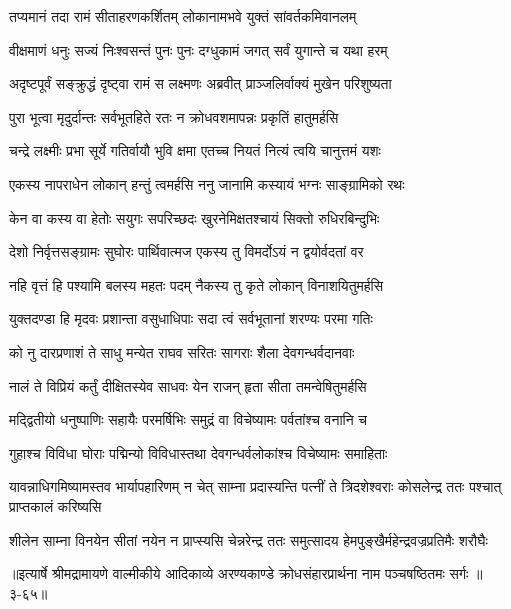 
\twolineshloka
{तप्यमानं तदा रामं सीताहरणकर्शितम्}
{लोकानामभवे युक्तं सांवर्तकमिवानलम्} %

\twolineshloka
{वीक्षमाणं धनुः सज्यं निःश्वसन्तं पुनः पुनः}
{दग्धुकामं जगत् सर्वं युगान्ते च यथा हरम्} %

\twolineshloka
{अदृष्टपूर्वं सङ्क्रुद्धं दृष्ट्वा रामं स लक्ष्मणः}
{अब्रवीत् प्राञ्जलिर्वाक्यं मुखेन परिशुष्यता} %

\twolineshloka
{पुरा भूत्वा मृदुर्दान्तः सर्वभूतहिते रतः}
{न क्रोधवशमापन्नः प्रकृतिं हातुमर्हसि} %

\twolineshloka
{चन्द्रे लक्ष्मीः प्रभा सूर्ये गतिर्वायौ भुवि क्षमा}
{एतच्च नियतं नित्यं त्वयि चानुत्तमं यशः} %

\twolineshloka
{एकस्य नापराधेन लोकान् हन्तुं त्वमर्हसि}
{ननु जानामि कस्यायं भग्नः साङ्ग्रामिको रथः} %

\twolineshloka
{केन वा कस्य वा हेतोः सयुगः सपरिच्छदः}
{खुरनेमिक्षतश्चायं सिक्तो रुधिरबिन्दुभिः} %

\twolineshloka
{देशो निर्वृत्तसङ्ग्रामः सुघोरः पार्थिवात्मज}
{एकस्य तु विमर्दोऽयं न द्वयोर्वदतां वर} %

\twolineshloka
{नहि वृत्तं हि पश्यामि बलस्य महतः पदम्}
{नैकस्य तु कृते लोकान् विनाशयितुमर्हसि} %

\twolineshloka
{युक्तदण्डा हि मृदवः प्रशान्ता वसुधाधिपाः}
{सदा त्वं सर्वभूतानां शरण्यः परमा गतिः} %

\twolineshloka
{को नु दारप्रणाशं ते साधु मन्येत राघव}
{सरितः सागराः शैला देवगन्धर्वदानवाः} %

\twolineshloka
{नालं ते विप्रियं कर्तुं दीक्षितस्येव साधवः}
{येन राजन् हृता सीता तमन्वेषितुमर्हसि} %

\twolineshloka
{मद्द्वितीयो धनुष्पाणिः सहायैः परमर्षिभिः}
{समुद्रं वा विचेष्यामः पर्वतांश्च वनानि च} %

\twolineshloka
{गुहाश्च विविधा घोराः पद्मिन्यो विविधास्तथा}
{देवगन्धर्वलोकांश्च विचेष्यामः समाहिताः} %

\threelineshloka
{यावन्नाधिगमिष्यामस्तव भार्यापहारिणम्}
{न चेत् साम्ना प्रदास्यन्ति पत्नीं ते त्रिदशेश्वराः}
{कोसलेन्द्र ततः पश्चात् प्राप्तकालं करिष्यसि} %

\twolineshloka
{शीलेन साम्ना विनयेन सीतां नयेन न प्राप्स्यसि चेन्नरेन्द्र}
{ततः समुत्सादय हेमपुङ्खैर्महेन्द्रवज्रप्रतिमैः शरौघैः} %


॥इत्यार्षे श्रीमद्रामायणे वाल्मीकीये आदिकाव्ये अरण्यकाण्डे क्रोधसंहारप्रार्थना नाम पञ्चषष्ठितमः सर्गः ॥३-६५॥
